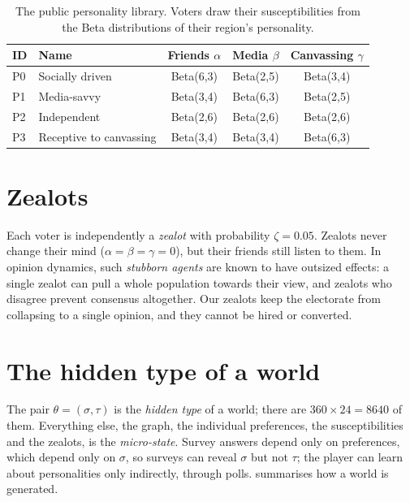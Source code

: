 \documentclass[11pt,a4paper,oneside]{report}
\begin{document}
\begin{table}[t]
\centering
\caption{The public personality library. Voters draw their susceptibilities from the Beta distributions
of their region's personality.}
\label{tab:personalities}
\small
\begin{tabular}{@{}llccc@{}}
\toprule
ID & Name & Friends $\alpha$ & Media $\beta$ & Canvassing $\gamma$ \\
\midrule
P0 & Socially driven         & Beta(6,3) & Beta(2,5) & Beta(3,4) \\
P1 & Media-savvy             & Beta(3,4) & Beta(6,3) & Beta(2,5) \\
P2 & Independent             & Beta(2,6) & Beta(2,6) & Beta(2,6) \\
P3 & Receptive to canvassing & Beta(3,4) & Beta(3,4) & Beta(6,3) \\
\bottomrule
\end{tabular}
\end{table}

\section{Zealots}

Each voter is independently a \emph{zealot} with probability $\zeta = 0.05$. Zealots never change their
mind ($\alpha=\beta=\gamma=0$), but their friends still listen to them. In opinion dynamics, such
\emph{stubborn agents} are known to have outsized effects: a single zealot can pull a whole population
towards their view, and zealots who disagree prevent consensus altogether.
Our zealots keep the electorate from collapsing to a single opinion, and they cannot be hired or
converted.

\section{The hidden type of a world}

The pair $\theta = (\sigma,\tau)$ is the \emph{hidden type} of a world; there are $360 \times 24 = 8640$
of them. Everything else, the graph, the individual preferences, the susceptibilities and the zealots, is
the \emph{micro-state}. Survey answers depend only on preferences, which depend only on $\sigma$, so
surveys can reveal $\sigma$ but not $\tau$; the player can learn about personalities only indirectly,
through polls.  summarises how a world is generated.
\end{document}
